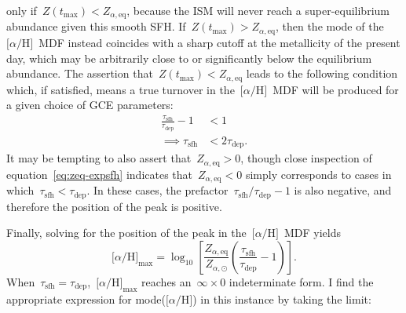\documentclass[12pt]{article}
\newcommand{\ah}{\ensuremath{\text{[$\alpha$/H]}}}
\newcommand{\timescale}[1]{\ensuremath{\tau_\text{#1}}}
\begin{document}
only if~$Z(t_\text{max}) < Z_{\alpha,\text{eq}}$, because the ISM will never
reach a super-equilibrium abundance given this smooth SFH.
If~$Z(t_\text{max}) > Z_{\alpha,\text{eq}}$, then the mode of the~\ah~MDF
instead coincides with a sharp cutoff at the metallicity of the present day,
which may be arbitrarily close to or significantly below the equilibrium
abundance.
The assertion that~$Z(t_\text{max}) < Z_{\alpha,\text{eq}}$ leads to the
following condition which, if satisfied, means a true turnover in the~\ah~MDF
will be produced for a given choice of GCE parameters:
\begin{subequations}\begin{align}
\frac{\timescale{sfh}}{\timescale{dep}} - 1 &< 1
\\
\implies \timescale{sfh} &< 2\timescale{dep}.
\label{eq:mode-ah-expsfh-criterion}
\end{align}\end{subequations}
It may be tempting to also assert that~$Z_{\alpha,\text{eq}} > 0$, though close
inspection of equation~\ref{eq:zeq-expsfh} indicates
that~$Z_{\alpha,\text{eq}} < 0$ simply corresponds to cases in
which~$\timescale{sfh} < \timescale{dep}$.
In these cases, the prefactor~$\timescale{sfh} / \timescale{dep} - 1$ is also
negative, and therefore the position of the peak is positive.
\par
Finally, solving for the position of the peak in the~\ah~MDF yields
\begin{equation}
\ah_\text{max} = \log_{10}\left[
\frac{Z_{\alpha,\text{eq}}}{Z_{\alpha,\odot}}
\left(\frac{\timescale{sfh}}{\timescale{dep}} - 1\right)
\right].
\label{eq:mode-ah-expsfh}
\end{equation}
When~$\timescale{sfh} = \timescale{dep}$,~$\ah_\text{max}$ reaches
an~$\infty \times 0$ indeterminate form.
I find the appropriate expression for mode(\ah) in this instance by taking
the limit:
\end{document}
